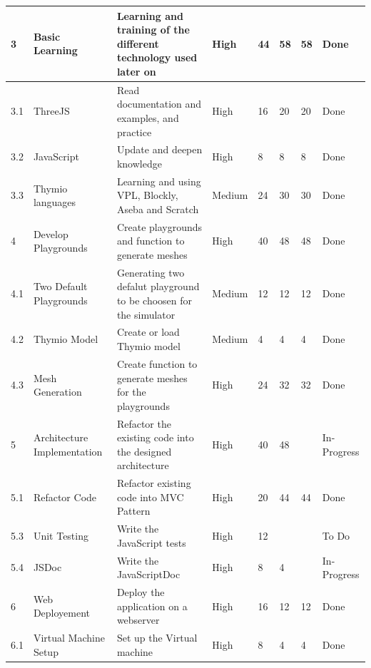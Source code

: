 \documentclass{scrartcl}
\begin{document}
\begin{table}[]
\begin{tabular}{l|l|l|l|l|l|l|l}
  \multicolumn{1}{|l|}{3} & Basic Learning & Learning and training of the different technology used later on & High & 44 & 58 & 58 & \multicolumn{1}{l|}{Done} \\ \hline
  \multicolumn{1}{|l|}{3.1} & ThreeJS & Read documentation and examples, and practice & High & 16 & 20 & 20 & \multicolumn{1}{l|}{Done} \\ \hline
  \multicolumn{1}{|l|}{3.2} & JavaScript & Update and deepen knowledge  & High & 8 & 8 & 8 & \multicolumn{1}{l|}{Done} \\ \hline
  \multicolumn{1}{|l|}{3.3} & Thymio languages & Learning and using VPL, Blockly, Aseba and Scratch & Medium & 24 & 30 & 30 & \multicolumn{1}{l|}{Done} \\ \hline
  \multicolumn{1}{|l|}{4} & Develop Playgrounds & Create playgrounds and function to generate meshes & High & 40 & 48 & 48 & \multicolumn{1}{l|}{Done} \\ \hline
  \multicolumn{1}{|l|}{4.1} & Two Default Playgrounds & Generating two defalut playground to be choosen for the simulator & Medium & 12 & 12 & 12 & \multicolumn{1}{l|}{Done} \\ \hline
  \multicolumn{1}{|l|}{4.2} & Thymio Model & Create or load Thymio model & Medium & 4 & 4 & 4 & \multicolumn{1}{l|}{Done} \\ \hline
  \multicolumn{1}{|l|}{4.3} & Mesh Generation & Create function to generate meshes for the playgrounds & High & 24 & 32 & 32 & \multicolumn{1}{l|}{Done} \\ \hline
  \multicolumn{1}{|l|}{5} & Architecture Implementation & Refactor the existing code into the designed architecture & High & 40 & 48 &  & \multicolumn{1}{l|}{In-Progress} \\ \hline
  \multicolumn{1}{|l|}{5.1} & Refactor Code & Refactor existing code into MVC Pattern & High & 20 & 44 & 44 & \multicolumn{1}{l|}{Done} \\ \hline
  \multicolumn{1}{|l|}{5.3} & Unit Testing & Write the JavaScript tests & High & 12 &  &  & \multicolumn{1}{l|}{To Do} \\ \hline
  \multicolumn{1}{|l|}{5.4} & JSDoc & Write the JavaScriptDoc & High & 8 & 4 &  & \multicolumn{1}{l|}{In-Progress} \\ \hline
  \multicolumn{1}{|l|}{6} & Web Deployement & Deploy the application on a webserver & High & 16 & 12 & 12 & \multicolumn{1}{l|}{Done} \\ \hline
  \multicolumn{1}{|l|}{6.1} & Virtual Machine Setup & Set up the Virtual machine & High & 8 & 4 & 4 & \multicolumn{1}{l|}{Done} \\ \hline

\end{tabular}
\end{table}
\end{document}
